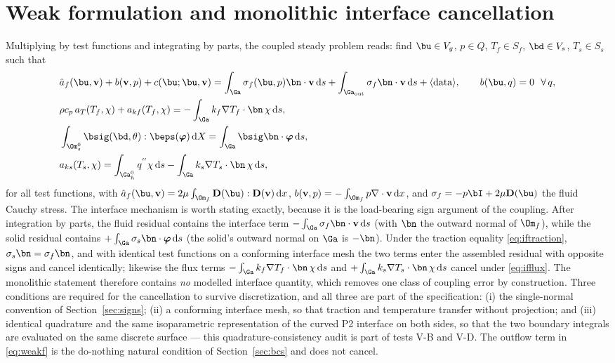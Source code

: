 \section{Weak formulation and monolithic interface cancellation}
\label{sec:coupling}
Multiplying by test functions and integrating by parts, the coupled steady problem reads: find
$\bu\in V_g$, $p\in Q$, $T_f\in S_f$, $\bd\in V_s$, $T_s\in S_s$ such that
\begin{align}
&\hat a_f(\bu,\mathbf v)+b(\mathbf v,p)+c(\bu;\bu,\mathbf v)
=\int_{\Ga}\sigma_f(\bu,p)\bn\cdot\mathbf v\,\mathrm ds
+\int_{\Ga_{\mathrm{out}}}\sigma_f\bn\cdot\mathbf v\,\mathrm ds +\langle\text{data}\rangle,
\qquad b(\bu,q)=0\ \ \forall\,q, \label{eq:weakf}\\
&\rho c_p\,a_T(T_f,\chi)+a_{kf}(T_f,\chi)
=-\int_{\Ga}k_f\nabla T_f\cdot\bn\,\chi\,\mathrm ds, \label{eq:weaktf}\\
&\int_{\Om_s^0}\bsig(\bd,\theta):\beps(\boldsymbol\varphi)\,\mathrm dX
=\int_{\Ga}\bsig\bn\cdot\boldsymbol\varphi\,\mathrm ds, \label{eq:weaks}\\
&a_{ks}(T_s,\chi)=\int_{\Ga_h^0}q^{''}\chi\,\mathrm ds
-\int_{\Ga}k_s\nabla T_s\cdot\bn\,\chi\,\mathrm ds , \label{eq:weakts}
\end{align}
for all test functions, with
$\hat a_f(\bu,\mathbf v)=2\mu\int_{\Om_f}\mathbf D(\bu):\mathbf D(\mathbf v)\,\mathrm dx$,
$b(\mathbf v,p)=-\int_{\Om_f}p\nabla\cdot\mathbf v\,\mathrm dx$, and
$\sigma_f=-p\bI+2\mu\mathbf D(\bu)$ the fluid Cauchy stress. The interface mechanism is worth
stating exactly, because it is the load-bearing sign argument of the coupling. After integration
by parts, the fluid residual contains the interface term
$-\int_{\Ga}\sigma_f\bn\cdot\mathbf v\,\mathrm ds$ (with $\bn$ the outward normal of $\Om_f$),
while the solid residual contains $+\int_{\Ga}\sigma_s\bn\cdot\boldsymbol\varphi\,\mathrm ds$
(the solid's outward normal on $\Ga$ is $-\bn$). Under the traction equality
\eqref{eq:iftraction}, $\sigma_s\bn=\sigma_f\bn$, and with identical test functions on a
conforming interface mesh the two terms enter the assembled residual with opposite signs and
cancel identically; likewise the flux terms $-\int_{\Ga}k_f\nabla T_f\cdot\bn\,\chi\,\mathrm ds$
and $+\int_{\Ga}k_s\nabla T_s\cdot\bn\,\chi\,\mathrm ds$ cancel under \eqref{eq:ifflux}. The
monolithic statement therefore contains \emph{no} modelled interface quantity, which removes one
class of coupling error by construction. Three conditions are required for the cancellation to
survive discretization, and all three are part of the specification: (i) the single-normal
convention of Section~\ref{sec:signs}; (ii) a conforming interface mesh, so that traction and
temperature transfer without projection; and (iii) identical quadrature and the same
isoparametric representation of the curved P2 interface on both sides, so that the two boundary
integrals are evaluated on the same discrete surface --- this quadrature-consistency audit is
part of tests V-B and V-D. The outflow term in \eqref{eq:weakf} is the do-nothing natural
condition of Section~\ref{sec:bcs} and does not cancel.

